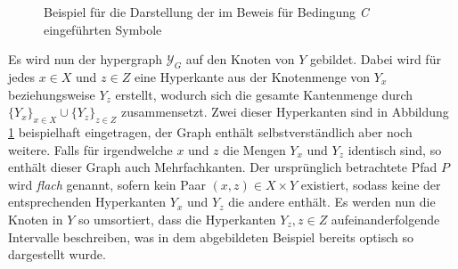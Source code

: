 \begin{figure}[t]
	\caption{Beispiel für die Darstellung der im Beweis für Bedingung \emph{C} eingeführten Symbole}
	\label{fig:hypergraph1}
\end{figure}


Es wird nun der \gls{hypergraph} $\mathcal{Y}_G$ auf den Knoten von $Y$ gebildet. 
Dabei wird für jedes $x\in X$ und $z\in Z$ eine Hyperkante aus der Knotenmenge von $Y_x$ beziehungsweise $Y_z$ erstellt, wodurch sich die gesamte Kantenmenge durch $\{Y_x\}_{x\in X}\cup \{Y_z\}_{z\in Z}$ zusammensetzt.
Zwei dieser Hyperkanten sind in Abbildung \ref{fig:hypergraph1} beispielhaft eingetragen, der Graph enthält selbstverständlich aber noch weitere.
Falls für irgendwelche $x$ und $z$ die Mengen $Y_x$ und $Y_z$ identisch sind, so enthält dieser Graph auch Mehrfachkanten.
Der ursprünglich betrachtete Pfad $P$ wird \emph{flach} genannt, sofern kein Paar $(x,z)\in X\times Y$ existiert, sodass keine der entsprechenden Hyperkanten $Y_x$ und $Y_z$ die andere enthält.
Es werden nun die Knoten in $Y$ so umsortiert, dass die Hyperkanten $Y_z, z\in Z$ aufeinanderfolgende Intervalle beschreiben, was in dem abgebildeten Beispiel bereits optisch so dargestellt wurde.

